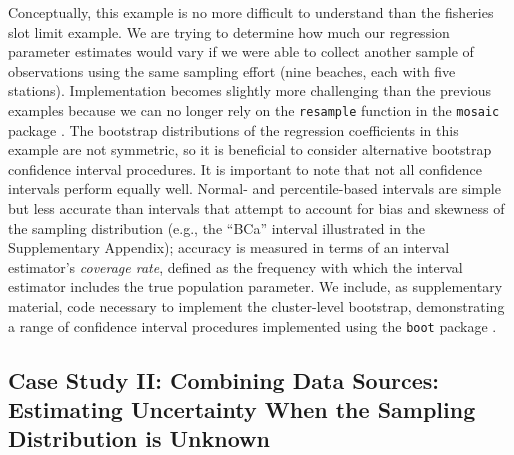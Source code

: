 \documentclass[fleqn,10pt]{wlpeerj} %
\begin{document}
Conceptually, this example is no more difficult to understand than the fisheries slot limit example. We are trying to determine how much our regression parameter estimates would vary if we were able to collect another sample of observations using the same sampling effort (nine beaches, each with five stations). Implementation becomes slightly more challenging than the previous examples because we can no longer rely on the \texttt{resample} function in the \texttt{mosaic} package \citep[it does not accommodate cluster-level bootstrapping, but see][ for an alternative using the \texttt{ClusterBootstrap} package]{deen2019clusterbootstrap}. The bootstrap distributions of the regression coefficients in this example are not symmetric, so it is beneficial to consider alternative bootstrap confidence interval procedures. It is important to note that not all confidence intervals perform equally well. Normal- and percentile-based intervals are simple but less accurate than intervals that attempt to account for bias and skewness of the sampling distribution (e.g., the ``BCa'' interval illustrated in the Supplementary Appendix); accuracy is measured in terms of an interval estimator's \emph{coverage rate}, defined as the frequency with which the interval estimator includes the true population parameter. We include, as supplementary material, code necessary to implement the cluster-level bootstrap, demonstrating a range of confidence interval procedures implemented using the \texttt{boot} package \citep[Supplementary Appendix B]{Canty2019}.

\hypertarget{case-study-ii-combining-data-sources-estimating-uncertainty-when-the-sampling-distribution-is-unknown}{%
\subsection*{Case Study II: Combining Data Sources: Estimating Uncertainty When the Sampling Distribution is Unknown}\label{case-study-ii-combining-data-sources-estimating-uncertainty-when-the-sampling-distribution-is-unknown}}
\end{document}
